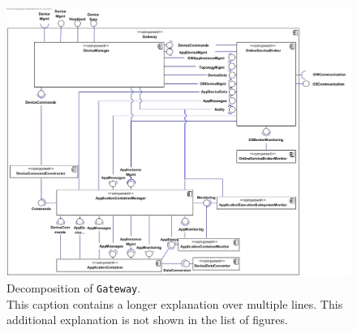 
\showdecompnotes{}


\begin{figure}[!htp]
	\centering
	\includegraphics[width=\textwidth]{images/component-diagram-Gateway}
	\caption[Decomposition of \texttt{Gateway}]{Decomposition of \texttt{Gateway}.\\
	This caption contains a longer explanation over multiple lines. This additional explanation is not shown in the list of figures.}\label{fig:decomp-component1}
\end{figure}



